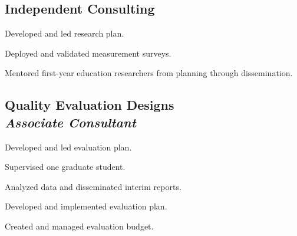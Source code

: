 
\subsection{\textbf{Independent Consulting}}
\begin{cvtable}
        {\color{cvsectioncolor}{Entrepreneurial Mindset and Cultural Wealth in Engineering}}
        {}
        {\begin{tightitemize}
            \item Developed and led research plan.
            \item Deployed and validated measurement surveys.
            \item Mentored first-year education researchers from planning through dissemination.
        \end{tightitemize}}
\end{cvtable}

\subsection{\textbf{Quality Evaluation Designs} 
\\
\textit{Associate Consultant}}
\begin{cvtable}
        {\color{cvsectioncolor}{Advocacy Building Campaign for Engineering Education Research}}
        {}
        {\begin{tightitemize}
            \item Developed and led evaluation plan.
            \item Supervised one graduate student.
            \item Analyzed data and disseminated interim reports.
        \end{tightitemize}}
        {\color{cvsectioncolor}{Peer Review as an Inclusive Mentoring Experience}}
        {}
        {\begin{tightitemize}
            \item Developed and implemented evaluation plan.
            \item Created and managed evaluation budget.
        \end{tightitemize}}
\end{cvtable}

